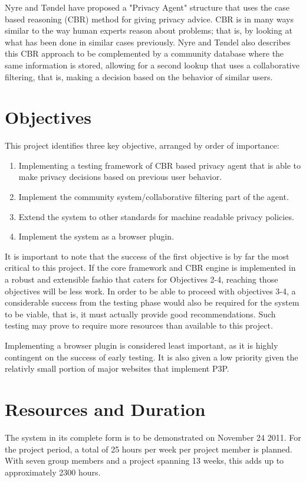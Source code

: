 Nyre and T{\o}ndel have proposed a "Privacy Agent" structure that uses the case based reasoning (CBR) method for giving privacy advice. CBR is in many ways similar to the way human experts reason about problems; that is, by looking at what has been done in similar cases previously. Nyre and T{\o}ndel also describes this CBR approach to be complemented by a community database where the same information is stored, allowing for a second lookup that uses a collaborative filtering, that is, making a decision based on the behavior of similar users. 

\section{Objectives}\label{mandateObjectives}
This project identifies three key objective, arranged by order of importance:

\begin{enumerate}
\item Implementing a testing framework of CBR based privacy agent that is able to make privacy decisions based on previous user behavior.
\item Implement the community system/collaborative filtering part of the agent.
\item Extend the system to other standards for machine readable privacy policies.
\item Implement the system as a browser plugin. 
\end{enumerate}

It is important to note that the success of the first objective is by far the most critical to this project. If the core framework and CBR engine is implemented in a robust and extensible fashio that caters for Objectives 2-4, reaching those objectives will be less work. In order to be able to proceed with objectives 3-4, a considerable success from the testing phase would also be required for the system to be viable, that is, it must actually provide good recommendations. Such testing may prove to require more resources than available to this project.

Implementing a browser plugin is considered least important, as it is highly contingent on the success of early testing. It is also given a low priority given the relativly small portion of major websites that implement P3P. 


\section{Resources and Duration}
The system in its complete form is to be demonstrated on November 24 2011. For the project period, a total of 25 hours per week per project member is planned. With seven group members and a project spanning 13 weeks, this adds up to approximately 2300 hours.


